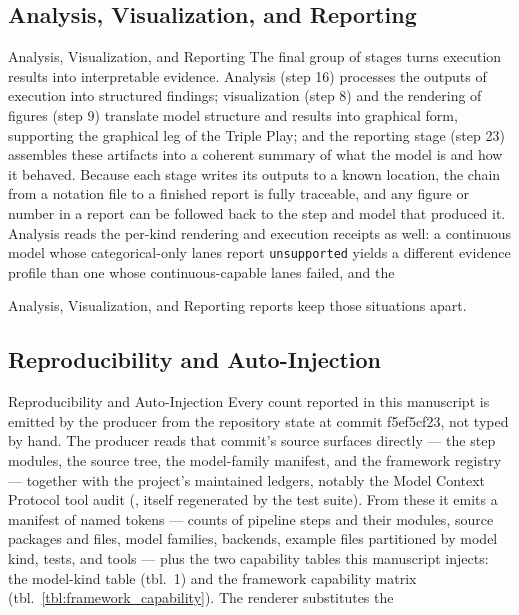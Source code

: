 \documentclass[
  ignorenonframetext,
]{beamer}
\begin{document}
\subsection{Analysis, Visualization, and
Reporting}\label{analysis-visualization-and-reporting}

\begin{frame}{Analysis, Visualization, and
Reporting}
The final group of stages turns execution results into interpretable
evidence. Analysis (step 16) processes the outputs of execution into
structured findings; visualization (step 8) and the rendering of figures
(step 9) translate model structure and results into graphical form,
supporting the graphical leg of the Triple Play; and the reporting stage
(step 23) assembles these artifacts into a coherent summary of what the
model is and how it behaved. Because each stage writes its outputs to a
known location, the chain from a notation file to a finished report is
fully traceable, and any figure or number in a report can be followed
back to the step and model that produced it. Analysis reads the per-kind
rendering and execution receipts as well: a continuous model whose
categorical-only lanes report \texttt{unsupported} yields a different
evidence profile than one whose continuous-capable lanes failed, and the
\end{frame}

\begin{frame}{Analysis, Visualization, and
Reporting}
reports keep those situations apart.
\end{frame}

\subsection{Reproducibility and
Auto-Injection}\label{reproducibility-and-auto-injection}

\begin{frame}{Reproducibility and
Auto-Injection}
Every count reported in this manuscript is emitted by the producer
 from the
repository state at commit f5ef5cf23, not typed by hand. The producer
reads that commit's source surfaces directly --- the step modules, the
source tree, the model-family manifest, and the framework registry ---
together with the project's maintained ledgers, notably the Model
Context Protocol tool audit (,
itself regenerated by the test suite). From these it emits a manifest of
named tokens --- counts of pipeline steps and their modules, source
packages and files, model families, backends, example files partitioned
by model kind, tests, and tools --- plus the two capability tables this
manuscript injects: the model-kind table (tbl.~1)
and the framework capability matrix
(tbl.~\ref{tbl:framework_capability}). The renderer substitutes the
\end{frame}
\end{document}
